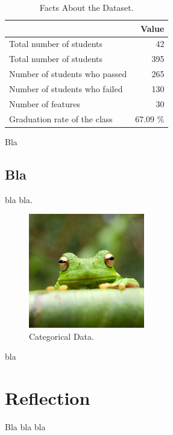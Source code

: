 \documentclass[a4paper]{article}
\begin{document}
\begin{table}[ht]
\centering
\begin{tabular}{l|r}
 & Value \\\hline
Total number of students & 42 \\
Total number of students & 395 \\
Number of students who passed & 265 \\
Number of students who failed & 130 \\
Number of features & 30 \\
Graduation rate of the class & 67.09 \%

\end{tabular}
\caption{\label{tab:basicfacts}Facts About the Dataset.}
\end{table}

Bla

\subsection{Bla}
bla bla.

\begin{figure}[ht]
\centering
\includegraphics[width=0.45\textwidth]{figures/frog.jpg}
\caption{\label{fig:categorical}Categorical Data.}
\end{figure}

bla


\section{Reflection}
Bla bla bla






\end{document}
